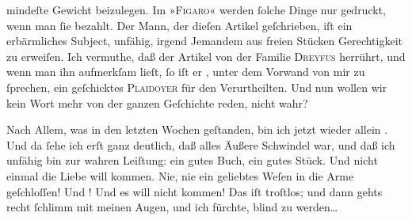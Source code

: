                mindeſte Gewicht beizulegen. Im »\textsc{Figaro}« werden{ }ſolche Dinge nur gedruckt, wenn man{ }ſie bezahlt. Der Mann, der dieſen Artikel geſchrieben, iſt ein erbärmliches
               Subject, unfähig, irgend Jemandem aus freien Stücken Gerechtigkeit zu erweiſen. Ich
               vermuthe, daß der Artikel von
               der Familie \textsc{Dreyfus} herrührt, {\pb}und wenn man ihn aufmerkſam lieſt,{ }ſo iſt er \strikeout{\textcolor{gray}{ein}}, unter dem Vorwand \strikeout{\textcolor{gray}{v}} von mir zu{ }ſprechen, ein geſchicktes \textsc{Plaidoyer} für den Verurtheilten. Und nun wollen
               wir kein Wort mehr von der ganzen Geſchichte reden, nicht wahr?\pend
           
\pstart
           Nach  Allem, was in den letzten Wochen \label{K_L02794-5v}\label{K_L02794-5} geſtanden, bin ich jetzt wieder
               allein \label{K_L02794-6v}\label{K_L02794-6}. Und da{ }ſehe ich erſt ganz deutlich, daß alles
               Äußere Schwindel war, und daß ich unfähig bin {\pb}zur
               wahren Leiſtung: ein gutes Buch, ein gutes Stück. Und nicht einmal die Liebe will
               kommen. Nie, nie ein geliebtes Weſen in die Arme geſchloſſen! Und \label{K_L02794-7v}\label{K_L02794-7}! Und es will nicht kommen! Das iſt troſtlos; und dann gehts
               recht{ }ſchlimm mit meinen Augen, und ich fürchte, blind zu werden{\dots}\pend
           
